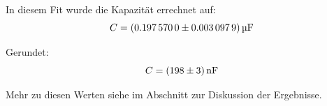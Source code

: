 In diesem Fit wurde die Kapazit\"at errechnet auf:
\begin{equation*}
    C = \SI[separate-uncertainty = true]{0.19757 \pm 0.0030979}{\micro\farad}
\end{equation*}

Gerundet:
\begin{equation*}
    C = \SI[separate-uncertainty = true]{198 \pm 3}{\nano\farad}
\end{equation*}

Mehr zu diesen Werten siehe im Abschnitt zur Diskussion der Ergebnisse.
